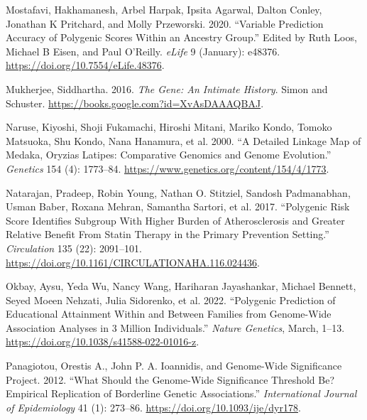 \documentclass[
]{book}
\newlength{\cslhangindent}
\newlength{\cslentryspacingunit} %
\newenvironment{CSLReferences}[2] %
 {%
  \setlength{\parindent}{0pt}
  \ifodd #1
  \let\oldpar\par
  \def\par{\hangindent=\cslhangindent\oldpar}
  \fi
  \setlength{\parskip}{#2\cslentryspacingunit}
 }%
 {}
\begin{document}
\begin{CSLReferences}{1}{0}
\leavevmode{}%
Mostafavi, Hakhamanesh, Arbel Harpak, Ipsita Agarwal, Dalton Conley, Jonathan K Pritchard, and Molly Przeworski. 2020. {``Variable Prediction Accuracy of Polygenic Scores Within an Ancestry Group.''} Edited by Ruth Loos, Michael B Eisen, and Paul O'Reilly. \emph{eLife} 9 (January): e48376. \url{https://doi.org/10.7554/eLife.48376}.

\leavevmode{}%
Mukherjee, Siddhartha. 2016. \emph{The {Gene}: {An Intimate History}}. {Simon and Schuster}. \url{https://books.google.com?id=XvAsDAAAQBAJ}.

\leavevmode{}%
Naruse, Kiyoshi, Shoji Fukamachi, Hiroshi Mitani, Mariko Kondo, Tomoko Matsuoka, Shu Kondo, Nana Hanamura, et al. 2000. {``A {Detailed Linkage Map} of {Medaka}, {Oryzias} Latipes: {Comparative Genomics} and {Genome Evolution}.''} \emph{Genetics} 154 (4): 1773--84. \url{https://www.genetics.org/content/154/4/1773}.

\leavevmode{}%
Natarajan, Pradeep, Robin Young, Nathan O. Stitziel, Sandosh Padmanabhan, Usman Baber, Roxana Mehran, Samantha Sartori, et al. 2017. {``Polygenic {Risk Score Identifies Subgroup With Higher Burden} of {Atherosclerosis} and {Greater Relative Benefit From Statin Therapy} in the {Primary Prevention Setting}.''} \emph{Circulation} 135 (22): 2091--101. \url{https://doi.org/10.1161/CIRCULATIONAHA.116.024436}.

\leavevmode{}%
Okbay, Aysu, Yeda Wu, Nancy Wang, Hariharan Jayashankar, Michael Bennett, Seyed Moeen Nehzati, Julia Sidorenko, et al. 2022. {``Polygenic Prediction of Educational Attainment Within and Between Families from Genome-Wide Association Analyses in 3 Million Individuals.''} \emph{Nature Genetics}, March, 1--13. \url{https://doi.org/10.1038/s41588-022-01016-z}.

\leavevmode{}%
Panagiotou, Orestis A., John P. A. Ioannidis, and Genome-Wide Significance Project. 2012. {``What Should the Genome-Wide Significance Threshold Be? {Empirical} Replication of Borderline Genetic Associations.''} \emph{International Journal of Epidemiology} 41 (1): 273--86. \url{https://doi.org/10.1093/ije/dyr178}.


\end{CSLReferences}
\end{document}
